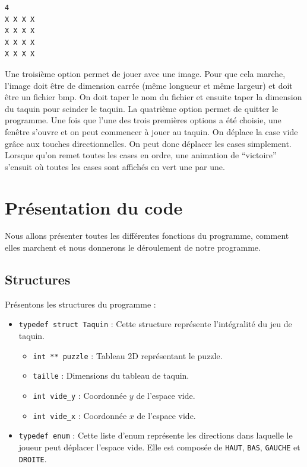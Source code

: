 \documentclass[11pt]{article}
\begin{document}
\begin{verbatim}
4
X X X X
X X X X
X X X X
X X X X
\end{verbatim}

Une troisième option permet de jouer avec une image. Pour que cela marche, l'image doit être de dimension carrée (même longueur et même largeur) et doit être un fichier bmp. On doit taper le nom du fichier et ensuite taper la dimension du taquin pour scinder le taquin. La quatrième option permet de quitter le programme.
Une fois que l'une des trois premières options a été choisie, une fenêtre s'ouvre et on peut commencer à jouer au taquin. On déplace la case vide grâce aux touches directionnelles. On peut donc déplacer les cases simplement. Lorsque qu'on remet toutes les cases en ordre, une animation de ``victoire'' s'ensuit où toutes les cases sont affichés en vert une par une.

\section{Présentation du code}
\label{sec:orged73d99}

Nous allons présenter toutes les différentes fonctions du programme, comment elles marchent et nous donnerons le déroulement de notre programme.

\subsection{Structures}
\label{sec:org30aaef5}

Présentons les structures du programme :

\begin{itemize}
\item \texttt{typedef struct Taquin} : Cette structure représente l'intégralité du jeu de taquin.
\begin{itemize}
\item \texttt{int ** puzzle} : Tableau 2D représentant le puzzle.
\item \texttt{taille} : Dimensions du tableau de taquin.
\item \texttt{int vide\_y} : Coordonnée \(y\) de l'espace vide.
\item \texttt{int vide\_x} : Coordonnée \(x\) de l'espace vide.
\end{itemize}
\item \texttt{typedef enum} : Cette liste d'enum représente les directions dans laquelle le joueur peut déplacer l'espace vide. Elle est composée de \texttt{HAUT}, \texttt{BAS}, \texttt{GAUCHE} et \texttt{DROITE}.
\end{itemize}
\end{document}
